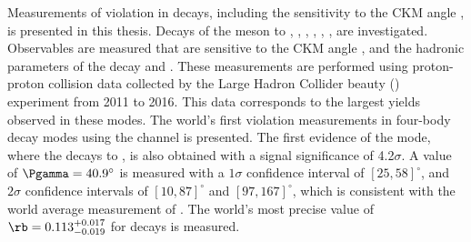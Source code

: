 
Measurements of \CP violation in \btodkst decays, including the sensitivity to the CKM angle \Pgamma, is presented in this thesis. Decays of the \Dz meson to \Km\pip, \Km\Kp, \pim\pip, \pim\Kp, \Km\pip\pim\pip, \pim\pip\pim\pip, \pim\Kp\pim\pip are investigated. Observables are measured that are sensitive to the CKM angle \Pgamma, and the hadronic parameters of the decay \rb and \deltab. These measurements are performed using proton-proton collision data collected by the Large Hadron Collider beauty (\lhcb) experiment from 2011 to 2016. This data corresponds to the largest yields observed in these modes. The world's first \CP violation measurements in four-body \Dz decay modes using the \btodkst channel is presented. The first evidence of the \btodkst mode, where the \Dz decays to \pim\Kp, is also obtained with a signal significance of 4.2$\sigma$. A value of $\Pgamma = 40.9^{\circ}$ is measured with a $1\sigma$ confidence interval of $[25, 58]^{\circ}$, and $2\sigma$ confidence intervals of $[10, 87]^{\circ}$ and $[97,167]^{\circ}$, which is consistent with the world average measurement of \Pgamma. The world's most precise value of $\rb = 0.113^{+0.017}_{-0.019}$ for \btodkst decays is measured.
